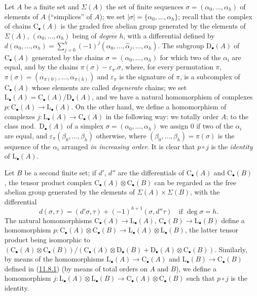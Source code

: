 \begin{env}[11.8.1]
\label{0.11.8.1}
Let $A$ be a finite set and $\Sigma(A)$ the set of finite sequences
$\sigma=(\alpha_0,\ldots,\alpha_h)$ of elements of $A$ (``simplices'' of
$A$); we set $|\sigma|=\{\alpha_0,\ldots,\alpha_h\}$; recall that the
complex of chains $\mathrm C_\bullet(A)$ is the graded free abelian group
generated by the elements of $\Sigma(A)$,
$(\alpha_0,\ldots,\alpha_h)$ being of \emph{degree} $h$, with a differential
defined by $d(\alpha_0,\ldots,\alpha_h)=\sum_{j=0}^{h}(-1)^j(\alpha_0,\ldots,\widehat{\alpha}_j,\ldots,\alpha_h)$.
The subgroup $\mathrm D_\bullet(A)$ of $\mathrm C_\bullet(A)$ generated by
the chains $\sigma=(\alpha_0,\ldots,\alpha_h)$ for which two of the
$\alpha_i$ are equal, and by the chains
$\pi(\sigma)-\varepsilon_\pi.\sigma$, where, for every permutation $\pi$, $\pi(\sigma)=(\alpha_{\pi(0)},\ldots,\alpha_{\pi(h)})$
and $\varepsilon_\pi$ is the signature of $\pi$, is a subcomplex of
$\mathrm C_\bullet(A)$ whose elements are called \emph{degenerate}
chains; we set
$\mathrm L_\bullet(A)=\mathrm C_\bullet(A)/\mathrm D_\bullet(A)$, and we have a
natural homomorphism of complexes $p:\mathrm C_\bullet(A)\longrightarrow\mathrm L_\bullet(A)$.
On the other hand, we define a homomorphism of complexes $j:\mathrm L_\bullet(A)\longrightarrow\mathrm C_\bullet(A)$
in the following way: we totally order $A$; to the class
mod.~$\mathrm D_\bullet(A)$ of a simplex
$\sigma=(\alpha_0,\ldots,\alpha_h)$ we assign $0$ if two of the
$\alpha_i$ are equal, and $\varepsilon_\pi(\beta_0,\ldots,\beta_h)$ otherwise,
where $(\beta_0,\ldots,\beta_h)=\pi(\sigma)$ is the sequence of the $\alpha_i$
arranged \emph{in increasing order}. It is clear that $p\circ
j$ is the \emph{identity} of $\mathrm L_\bullet(A)$.
\end{env}

\begin{env}[11.8.2]
\label{0.11.8.2}
Let $B$ be a second finite set; if $d'$, $d''$ are the differentials of
$\mathrm C_\bullet(A)$ and $\mathrm C_\bullet(B)$, the tensor product
complex $\mathrm C_\bullet(A)\otimes\mathrm C_\bullet(B)$ can be
regarded as the free abelian group generated by the elements of
$\Sigma(A)\times\Sigma(B)$, with the differential
\[
d(\sigma,\tau)=(d'\sigma,\tau)+(-1)^{h+1}(\sigma,d''\tau)
\quad\text{if }\deg\sigma=h.
\]
The natural homomorphisms
$\mathrm C_\bullet(A)\to\mathrm L_\bullet(A)$,
$\mathrm C_\bullet(B)\to\mathrm L_\bullet(B)$ define a homomorphism $p:\mathrm C_\bullet(A)\otimes\mathrm C_\bullet(B)\longrightarrow\mathrm L_\bullet(A)\otimes\mathrm L_\bullet(B)$,
the latter tensor product being isomorphic to $(\mathrm C_\bullet(A)\otimes\mathrm C_\bullet(B))/(\mathrm C_\bullet(A)\otimes\mathrm D_\bullet(B)+\mathrm D_\bullet(A)\otimes\mathrm C_\bullet(B))$.
Similarly, by means of the homomorphisms
$\mathrm L_\bullet(A)\to\mathrm C_\bullet(A)$ and
$\mathrm L_\bullet(B)\to\mathrm C_\bullet(B)$ defined in
(\hyperref[0.11.8.1]{11.8.1}) (by means of total orders on $A$ and $B$),
we define a homomorphism $j:\mathrm L_\bullet(A)\otimes\mathrm L_\bullet(B)\longrightarrow\mathrm C_\bullet(A)\otimes\mathrm C_\bullet(B)$
such that $p\circ j$ is the identity.
\end{env}

